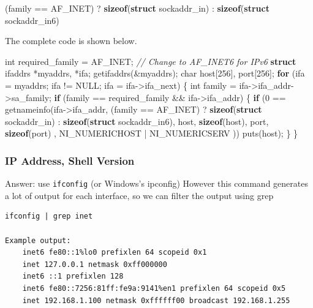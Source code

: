 \documentclass[]{article}
\newenvironment{Shaded}{}{}
\newcommand{\KeywordTok}[1]{\textcolor[rgb]{0.00,0.44,0.13}{\textbf{{#1}}}}
\newcommand{\DataTypeTok}[1]{\textcolor[rgb]{0.56,0.13,0.00}{{#1}}}
\newcommand{\DecValTok}[1]{\textcolor[rgb]{0.25,0.63,0.44}{{#1}}}
\newcommand{\CommentTok}[1]{\textcolor[rgb]{0.38,0.63,0.69}{\textit{{#1}}}}
\newcommand{\NormalTok}[1]{{#1}}
\begin{document}
\begin{Shaded}
\begin{Highlighting}[]
 \NormalTok{(family == AF_INET) ? }\KeywordTok{sizeof}\NormalTok{(}\KeywordTok{struct} \NormalTok{sockaddr_in) : }\KeywordTok{sizeof}\NormalTok{(}\KeywordTok{struct} \NormalTok{sockaddr_in6)}
\end{Highlighting}
\end{Shaded}

The complete code is shown below.

\begin{Shaded}
\begin{Highlighting}[]
    \DataTypeTok{int} \NormalTok{required_family = AF_INET; }\CommentTok{// Change to AF_INET6 for IPv6}
    \KeywordTok{struct} \NormalTok{ifaddrs *myaddrs, *ifa;}
    \NormalTok{getifaddrs(&myaddrs);}
    \DataTypeTok{char} \NormalTok{host[}\DecValTok{256}\NormalTok{], port[}\DecValTok{256}\NormalTok{];}
    \KeywordTok{for} \NormalTok{(ifa = myaddrs; ifa != NULL; ifa = ifa->ifa_next) \{}
        \DataTypeTok{int} \NormalTok{family = ifa->ifa_addr->sa_family;}
        \KeywordTok{if} \NormalTok{(family == required_family && ifa->ifa_addr) \{}
            \KeywordTok{if} \NormalTok{(}\DecValTok{0} \NormalTok{== getnameinfo(ifa->ifa_addr,}
                                \NormalTok{(family == AF_INET) ? }\KeywordTok{sizeof}\NormalTok{(}\KeywordTok{struct} \NormalTok{sockaddr_in) :}
                                \KeywordTok{sizeof}\NormalTok{(}\KeywordTok{struct} \NormalTok{sockaddr_in6),}
                                \NormalTok{host, }\KeywordTok{sizeof}\NormalTok{(host), port, }\KeywordTok{sizeof}\NormalTok{(port)}
                                 \NormalTok{, NI_NUMERICHOST | NI_NUMERICSERV  ))}
                \NormalTok{puts(host);}
            \NormalTok{\}}
        \NormalTok{\}}
\end{Highlighting}
\end{Shaded}

\subsubsection{IP Address, Shell
Version}\label{whats-my-machines-ip-address-shell-version}

Answer: use \texttt{ifconfig} (or Windows's ipconfig) However this
command generates a lot of output for each interface, so we can filter
the output using grep

\begin{verbatim}
ifconfig | grep inet

Example output:
    inet6 fe80::1%lo0 prefixlen 64 scopeid 0x1 
    inet 127.0.0.1 netmask 0xff000000 
    inet6 ::1 prefixlen 128 
    inet6 fe80::7256:81ff:fe9a:9141%en1 prefixlen 64 scopeid 0x5 
    inet 192.168.1.100 netmask 0xffffff00 broadcast 192.168.1.255
\end{verbatim}
\end{document}
